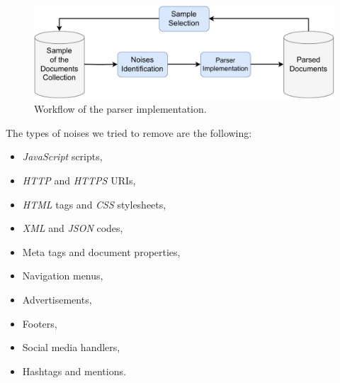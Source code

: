 \begin{figure}[!h]
    \centering
    \includegraphics[width=0.8\linewidth]{figure/Parser_implementation_workflow.pdf}
    \caption{Workflow of the parser implementation.}
    \label{fig:Parser_implementation_workflow}
\end{figure}

The types of noises we tried to remove are the following:
\begin{itemize}
\item \textit{JavaScript} scripts,
\item \textit{HTTP} and \textit{HTTPS} URIs,
\item \textit{HTML} tags and \textit{CSS} stylesheets,
\item \textit{XML} and \textit{JSON} codes,
\item Meta tags and document properties,
\item Navigation menus,
\item Advertisements,
\item Footers,
\item Social media handlers,
\item Hashtags and mentions.
\end{itemize}

